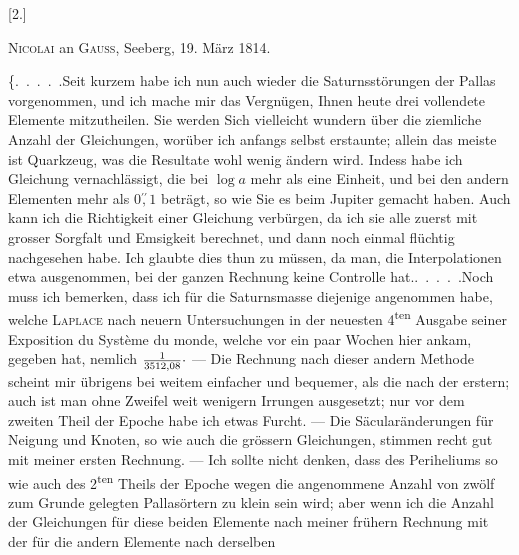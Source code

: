 \clearpage
\begingroup
{}
\renewcommand{\headrulewidth}{0pt}
\par\medskip
{}
\begin{center}
[2.]\par\medskip
\textsc{Nicolai} an \textsc{Gauss}, Seeberg, 19. März 1814.
\end{center}
\par\noindent\hspace*{\parindent}\{.\ .\ .\ .\ .\quad Seit kurzem habe ich nun auch wieder die Saturnsstörungen der
Pallas vorgenommen, und ich mache mir das Vergnügen, Ihnen heute drei
vollendete Elemente mitzutheilen. Sie werden Sich vielleicht wundern über
die ziemliche Anzahl der Gleichungen, worüber ich anfangs selbst erstaunte;
allein das meiste ist Quarkzeug, was die Resultate wohl wenig ändern wird.
Indess habe ich  Gleichung vernachlässigt, die bei \(\log a\) mehr
als eine Einheit, und bei den andern Elementen mehr als \(0\overset{\prime\prime}{,}1\) beträgt, so wie
Sie es beim Jupiter gemacht haben. Auch kann ich die Richtigkeit einer
 Gleichung verbürgen, da ich sie alle zuerst mit grosser Sorgfalt und
Emsigkeit berechnet, und dann noch einmal flüchtig nachgesehen habe. Ich
glaubte dies thun zu müssen, da man, die Interpolationen etwa ausgenommen,
bei der ganzen Rechnung keine Controlle hat.\quad .\ .\ .\ .\ .\quad Noch muss ich bemerken,
dass ich für die Saturnsmasse diejenige angenommen habe, welche
\textsc{Laplace} nach neuern Untersuchungen in der neuesten 4\textsuperscript{ten} Ausgabe seiner
Exposition du Système du monde, welche vor ein paar Wochen hier ankam, gegeben
hat, nemlich \(\frac{1}{3512{,}08}\mathpunct{\raisebox{.45ex}{.}}\) --- Die Rechnung nach dieser andern Methode
scheint mir übrigens bei weitem einfacher und bequemer, als die nach der
erstern; auch ist man ohne Zweifel weit wenigern Irrungen ausgesetzt; nur
vor dem zweiten Theil der Epoche habe ich etwas Furcht. --- Die Säcularänderungen
für Neigung und Knoten, so wie auch die grössern Gleichungen,
stimmen recht gut mit meiner ersten Rechnung. --- Ich sollte nicht denken,
dass des Periheliums so wie auch des 2\textsuperscript{ten} Theils der Epoche wegen die angenommene
Anzahl von zwölf zum Grunde gelegten Pallasörtern zu klein sein
wird; aber wenn ich die Anzahl der Gleichungen für diese beiden Elemente
nach meiner frühern Rechnung mit der für die andern Elemente nach derselben

